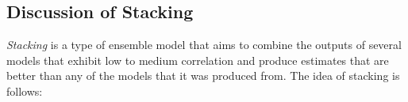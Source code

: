 \documentclass[10pt,a4paper, hidelinks]{article} %
\begin{document}
\subsection{Discussion of Stacking}

\textit{Stacking} is a type of ensemble model that aims to combine the outputs of several models that exhibit low to medium correlation and produce estimates that are better than any of the models that it was produced from. The idea of stacking is follows:

\newcommand{\dattrain}{\ensuremath{Data_{train}}\xspace}
\newcommand{\datval}{\ensuremath{Data_{validation}}\xspace}
\newcommand{\dattest}{\ensuremath{Data_{test}}\xspace}
\newcommand{\dattestpreds}{\ensuremath{Data_{test + preds}}\xspace}
\newcommand{\datvaltest}{\ensuremath{Data_{validation + preds}}\xspace}
\end{document}
